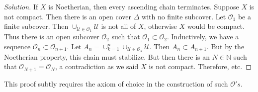 \documentclass[crop=false,class=article,oneside]{standalone}
\begin{document}
            \begin{proof}[Solution]
                If $X$ is Noetherian, then every ascending
                chain terminates. Suppose $X$ is not compact.
                Then there is an open cover $\Delta$ with no
                finite subcover. Let $\mathcal{O}_1$ be a finite
                subcover. Then
                $\cup_{\mathcal{U}\in \mathcal{O}_1}\mathcal{U}$
                is not all of $X$, otherwise $X$ would be compact.
                Thus there is an open subcover $\mathcal{O}_2$
                such that $\mathcal{O}_1 \subset \mathcal{O}_2$.
                Inductively, we have a sequence
                $\mathcal{O}_n\subset \mathcal{O}_{n+1}$. Let
                $A_{n}=\cup_{k=1}^{n}\cup_{\mathcal{U}\in \mathcal{O}_k}\mathcal{U}$.
                Then $A_{n}\subset A_{n+1}$.
                But by the Noetherian property,
                this chain must stabilize.
                But then there is an $N\in \mathbb{N}$
                such that $\mathcal{O}_{N+1}=\mathcal{O}_N$,
                a contradiction as we said $X$ is not compact.
                Therefore, etc.
            \end{proof}
            \begin{remark}
                This proof subtly requires the axiom of
                choice in the construction of such
                $\mathcal{O}'s$.
            \end{remark}
\end{document}
